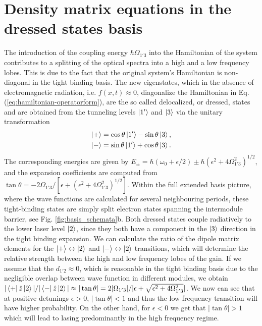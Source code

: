 \documentclass[]{spie}  %
\begin{document}
\section{Density matrix equations in the dressed states basis}
\label{sec:biasdependence}

The introduction of the coupling energy $\hbar \Omega_{1'3}$ into the
Hamiltonian of the system contributes to a splitting of the optical spectra
into a high and a low frequency lobes. This is due to the fact that the
original system's Hamiltonian is non-diagonal in the tight binding basis. The
new eigenstates, which in the absence of electromagnetic radiation, i.e.
$f(x,t) \approx 0$, diagonalize the Hamiltonian in Eq.
(\ref{eq:hamiltonian-operatorform}), are the so called delocalized, or dressed,
states and are obtained from the tunneling levels $\Ket{1'}$ and $\Ket{3}$ via
the unitary transformation \begin{align} \label{eq:dressedstates} \Ket{+} &=
\cos\theta \Ket{1'} - \sin\theta \Ket{3}, \nonumber \\ \Ket{-} &= \sin\theta
\Ket{1'} + \cos\theta \Ket{3}.  \end{align} The corresponding energies are
given by $E_\pm =\hbar(\omega_0 +\epsilon/2) \pm \hbar
\left(\epsilon^2+4\Omega_{1'3}^2\right )^{1/2}$, and the expansion coefficients
are computed from   $ \tan \theta =
-2\Omega_{1'3}/[\epsilon+(\epsilon^2+4\Omega_{1'3}^2)^{1/2}].  $ Within the
full extended basis picture, where the wave functions are calculated for
several neighbouring periods, these tight-binding states are simply split
electron states spanning the intermodule barrier, see Fig.
\ref{fig:basis_schemata}b. Both dressed states  couple radiatively to the lower
laser level $\ket{2}$, since they both have a component in the $\ket{3}$
direction in the tight binding expansion. We can calculate the ratio of the
dipole matrix elements for the $\Ket{+}\leftrightarrow\Ket{2}$ and
$\Ket{-}\leftrightarrow\Ket{2}$ transitions, which will determine the relative
strength between the high and low frequency lobes of the gain. If we assume
that the $d_{1'2} \approx 0$, which is reasonable in the tight binding basis
due to the negligible overlap between wave function in different modules, we
obtain  $|\Bra{+}\hat{z}\Ket{2}|/|\Bra{-}\hat{z}\Ket{2} | \approx |\tan\theta|
=  2|\Omega_{1'3}|/|\epsilon+\sqrt{\epsilon^2+4\Omega_{1'3}^2}|$. We now can
see that at positive detunings $\epsilon >0$, $|\tan\theta|<1$ and thus the low
frequency transition will have higher probability. On the other hand, for
$\epsilon < 0 $ we get that $|\tan\theta| >1$ which will lead to lasing
predominantly in the high frequency regime.
\end{document}

